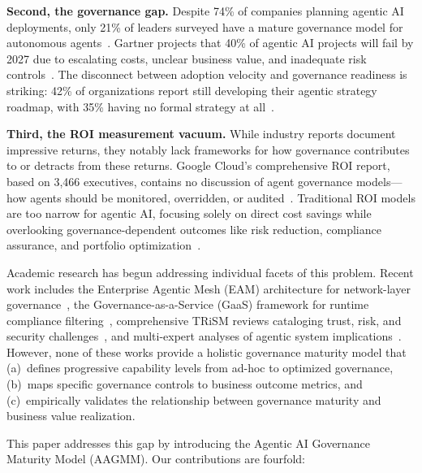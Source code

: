 \documentclass[ai,article,submit,pdftex,moreauthors]{Definitions/mdpi}
\begin{document}
\textbf{Second, the governance gap.} Despite 74\% of companies planning agentic AI deployments, only 21\% of leaders surveyed have a mature governance model for autonomous agents~\cite{deloitte2026state}. Gartner projects that 40\% of agentic AI projects will fail by 2027 due to escalating costs, unclear business value, and inadequate risk controls~\cite{arcade2025trends}. The disconnect between adoption velocity and governance readiness is striking: 42\% of organizations report still developing their agentic strategy roadmap, with 35\% having no formal strategy at all~\cite{deloitte2025emerging}.

\textbf{Third, the ROI measurement vacuum.} While industry reports document impressive returns, they notably lack frameworks for how governance contributes to or detracts from these returns. Google Cloud's comprehensive ROI report, based on 3,466 executives, contains no discussion of agent governance models---how agents should be monitored, overridden, or audited~\cite{aigl2025roi}. Traditional ROI models are too narrow for agentic AI, focusing solely on direct cost savings while overlooking governance-dependent outcomes like risk reduction, compliance assurance, and portfolio optimization~\cite{moveworks2025roi}.

Academic research has begun addressing individual facets of this problem. Recent work includes the Enterprise Agentic Mesh (EAM) architecture for network-layer governance~\cite{gupta2025eam}, the Governance-as-a-Service (GaaS) framework for runtime compliance filtering~\cite{fernandez2025gaas}, comprehensive TRiSM reviews cataloging trust, risk, and security challenges~\cite{ray2025trism}, and multi-expert analyses of agentic system implications~\cite{crick2025agents}. However, none of these works provide a holistic governance maturity model that (a)~defines progressive capability levels from ad-hoc to optimized governance, (b)~maps specific governance controls to business outcome metrics, and (c)~empirically validates the relationship between governance maturity and business value realization.

This paper addresses this gap by introducing the Agentic AI Governance Maturity Model (AAGMM). Our contributions are fourfold:
\end{document}
